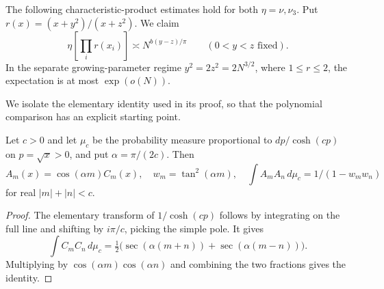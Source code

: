 \begin{lemma}\label{lemma:characteristic-products}
The following characteristic-product estimates hold for both $\eta=\nu,\nu_3$. Put $r(x)=(x+y^2)/(x+z^2)$. We claim
\begin{equation}
 \eta\left[\prod_i r(x_i)\right]\asymp N^{b(y-z)/\pi}\qquad (0<y<z\text{ fixed}).                 \label{eq:legacy-P-8}
\end{equation}
In the separate growing-parameter regime $y^2=2z^2=2N^{3/2}$, where $1\le r\le2$, the expectation is at most $\exp(o(N))$. \end{lemma}

We isolate the elementary identity used in its proof, so that the polynomial comparison has an explicit starting point.
\begin{lemma}\label{lemma:polynomial-generating}
Let $c>0$ and let $\mu_c$ be the probability measure proportional to $dp/\cosh(cp)$ on $p=\sqrt{x}>0$, and put $\alpha=\pi/(2c)$. Then
\begin{equation}
 A_m(x)=\cos(\alpha m)C_m(x),\quad w_m=\tan^2(\alpha m),\quad
 \int A_mA_n\,d\mu_c=1/(1-w_mw_n)
 \label{eq:legacy-P-9}
\end{equation}
for real $|m|+|n|<c$.
\end{lemma}
\begin{proof}
The elementary transform of $1/\cosh(cp)$ follows by integrating on the full line and shifting by $i\pi/c$, picking the simple pole. It gives
\[
 \int C_m C_n\,d\mu_c
 =\tfrac12\bigl(\sec(\alpha(m+n))+\sec(\alpha(m-n))\bigr).
\]
Multiplying by $\cos(\alpha m)\cos(\alpha n)$ and combining the two fractions gives the identity.
\end{proof}


